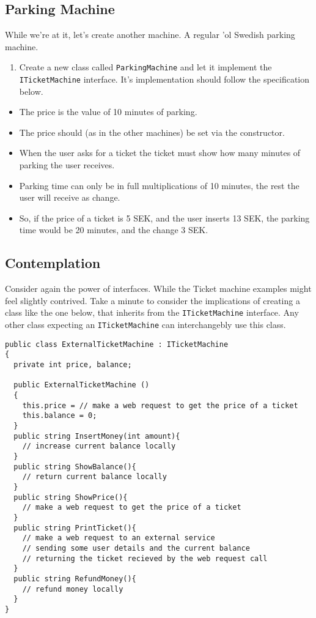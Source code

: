 \documentclass{article}
\newcounter{stepcounter}
\newenvironment{steps}{ 
  \begin{enumerate}[label=\color{red}Step \thesection-\theenumi)]
    \setcounter{enumi}{\value{stepcounter}}
}{
  \setcounter{stepcounter}{\value{enumi}}
  \end{enumerate}
}
\begin{document}
\subsection{Parking Machine}
While we're at it, let's create another machine. A regular 'ol Swedish parking machine.

\begin{steps}
\item Create a new class called \texttt{ParkingMachine} and let it implement the \texttt{ITicketMachine} interface. It's implementation should follow the specification below.
\end{steps}
\begin{itemize}
  \item The price is the value of 10 minutes of parking.
  \item The price should (as in the other machines) be set via the constructor.
  \item When the user asks for a ticket the ticket must show how many minutes of parking the user receives.
  \item Parking time can only be in full multiplications of 10 minutes, the rest the user will receive as change.
  \item So, if the price of a ticket is 5 SEK, and the user inserts 13 SEK, the parking time would be 20 minutes, and the change 3 SEK.
\end{itemize}






\subsection{Contemplation}
Consider again the power of interfaces. While the Ticket machine examples might feel slightly contrived. Take a minute to consider the implications of creating a class like the one below, that inherits from the \texttt{ITicketMachine} interface. Any other class expecting an \texttt{ITicketMachine} can interchangebly use this class.
\begin{lstlisting}
public class ExternalTicketMachine : ITicketMachine
{ 
  private int price, balance;

  public ExternalTicketMachine ()
  {
    this.price = // make a web request to get the price of a ticket
    this.balance = 0;
  }
  public string InsertMoney(int amount){
    // increase current balance locally
  }
  public string ShowBalance(){
    // return current balance locally
  }
  public string ShowPrice(){
    // make a web request to get the price of a ticket
  }
  public string PrintTicket(){
    // make a web request to an external service
    // sending some user details and the current balance
    // returning the ticket recieved by the web request call
  }
  public string RefundMoney(){
    // refund money locally
  }
}
\end{lstlisting}
\end{document}
